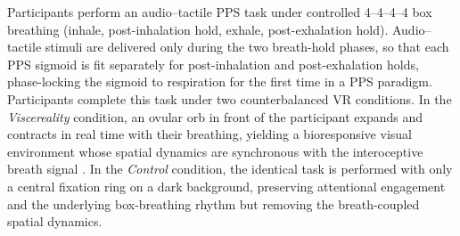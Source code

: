 Participants perform an audio--tactile PPS task \citep{Canzoneri2012, teneggi2013social} under controlled 4--4--4--4 box breathing (inhale, post-inhalation hold, exhale, post-exhalation hold). Audio--tactile stimuli are delivered only during the two breath-hold phases, so that each PPS sigmoid is fit separately for post-inhalation and post-exhalation holds, phase-locking the sigmoid to respiration for the first time in a PPS paradigm. Participants complete this task under two counterbalanced VR conditions. In the \emph{Viscereality} condition, an ovular orb in front of the participant expands and contracts in real time with their breathing, yielding a bioresponsive visual environment whose spatial dynamics are synchronous with the interoceptive breath signal \citep{Goral2024}. In the \emph{Control} condition, the identical task is performed with only a central fixation ring on a dark background, preserving attentional engagement and the underlying box-breathing rhythm but removing the breath-coupled spatial dynamics.

